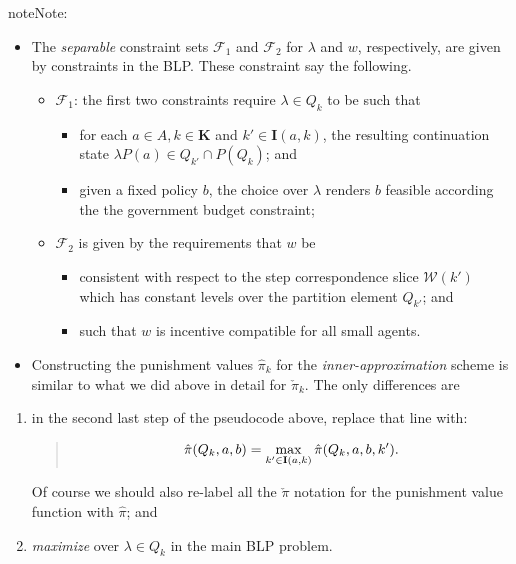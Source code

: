 \documentclass[a4paper,10pt,english]{sphinxmanual}
\begin{document}
\begin{notice}{note}{Note:}\begin{itemize}
\item {} 
The \emph{separable} constraint sets \(\mathcal{F}_1\) and
\(\mathcal{F}_2\) for \(\lambda\) and \(w\), respectively,
are given by constraints in the BLP. These constraint say the following.
\begin{itemize}
\item {} 
\(\mathcal{F}_1\): the first two constraints require \(\lambda \in Q_k\) to be such that
\begin{itemize}
\item {} 
for each \(a \in A, k \in \mathbf{K}\) and \(k' \in
\mathbf{I}(a,k)\), the resulting continuation state \(\lambda P(a) \in Q_{k'} \cap P(Q_k)\); and

\item {} 
given a fixed policy \(b\), the choice over \(\lambda\)
renders \(b\) feasible according the the government budget
constraint;

\end{itemize}

\item {} 
\(\mathcal{F}_2\) is given by the requirements that \(w\) be
\begin{itemize}
\item {} 
consistent with respect to the step correspondence slice
\(\mathcal{W}(k')\) which has constant levels over the partition
element \(Q_{k'}\); and

\item {} 
such that \(w\) is incentive compatible for all small
agents.

\end{itemize}

\end{itemize}

\item {} 
Constructing the punishment values \(\hat{\pi}_k\) for the \emph{inner-approximation} scheme is similar to what we did above in detail for \(\check{\pi}_k\). The only differences are

\end{itemize}
\begin{enumerate}
\item {} 
in the second last step of the pseudocode above, replace that line with:
\begin{quote}
\begin{gather}
\begin{split}\hat{\pi}(Q_k,a,b) = \max_{k' \in \mathbf{I}(a,k)} \hat{\pi}(Q_k,a,b,k').\end{split}\notag
\end{gather}\end{quote}

Of course we should also re-label all the \(\check{\pi}\) notation for the punishment value function with \(\hat{\pi}\); and

\item {} 
\emph{maximize} over \(\lambda \in Q_k\) in the main BLP problem.

\end{enumerate}
\end{notice}
\end{document}
